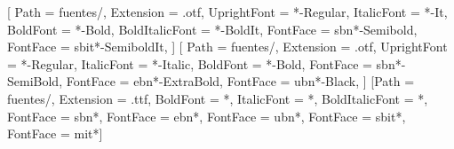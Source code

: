 
\usepackage[a4paper, top=3cm, bottom=2.7cm, left=2.5cm, right=2.5cm,
            headheight=1.1cm, headsep=0.7cm, footskip=1.3cm]{geometry}

\usepackage{fontspec}
\usepackage{babel}

\setmainfont{SourceSans3}[
  Path           = fuentes/,
  Extension      = .otf,
  UprightFont    = *-Regular,
  ItalicFont     = *-It,
  BoldFont       = *-Bold,
  BoldItalicFont = *-BoldIt,
  FontFace       = {sb}{n}{*-Semibold},
  FontFace       = {sb}{it}{*-SemiboldIt},
]
\newfontfamily{}[
  Path        = fuentes/,
  Extension   = .otf,
  UprightFont = *-Regular,
  ItalicFont  = *-Italic,
  BoldFont    = *-Bold,
  FontFace    = {sb}{n}{*-SemiBold},
  FontFace    = {eb}{n}{*-ExtraBold},
  FontFace    = {ub}{n}{*-Black},
]
\newfontfamily{}[Path = fuentes/, Extension = .ttf,
  BoldFont = *, ItalicFont = *, BoldItalicFont = *,
  FontFace = {sb}{n}{*}, FontFace = {eb}{n}{*}, FontFace = {ub}{n}{*},
  FontFace = {sb}{it}{*}, FontFace = {m}{it}{*}]

\linespread{1.1}
\setlength{\parindent}{0pt}
\setlength{\parskip}{0.55em plus 0.15em}
\setlength{\emergencystretch}{2.5em}

\usepackage{xcolor}
\usepackage{graphicx}
\usepackage{float}
\usepackage{tabularx}
\usepackage{tabularray}
\usepackage{enumitem}
\usepackage{titlesec}
\usepackage{titletoc}
\usepackage{fancyhdr}
\usepackage{caption}
\usepackage[most]{tcolorbox}
\usepackage{tikz}
\usetikzlibrary{calc, positioning, arrows.meta, shapes.symbols, shapes.misc,
                decorations.pathreplacing, fit, backgrounds}
\usepackage{microtype}

